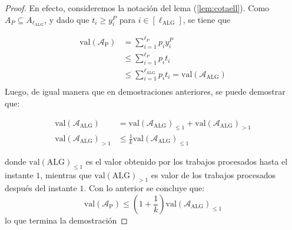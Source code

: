 \documentclass[10pt]{article}
\newcommand{\val}[1]{\text{val}(#1)}
\theoremstyle{plain}
\theoremstyle{definition}
\begin{document}
\begin{proof}
En efecto, consideremos la notación del lema (\ref{lem:cotaell}). Como $A_P \subseteq A_{\ell_{\text{ALG}}}$, y dado que $t_i \geq y^P_i$ para $i \in [\ell_{\text{ALG}}]$, se tiene que

\begin{align*}
\val{\mathcal{A}_\text{P}} &= \sum_{i=1}^{\ell_P} p_i y^P_i \\
						&\leq \sum_{i=1}^{\ell_P} p_i t_i \\
						&\leq \sum_{i=1}^{\ell_{\text{ALG}}} p_i t_i = \val{\mathcal{A}_\text{ALG}}\\
\end{align*}
Luego, de igual manera que en demostraciones anteriores, se puede demostrar que:

\begin{align*}
\val{\mathcal{A}_\text{ALG}} &= \val{\mathcal{A}_\text{ALG}}_{\leq 1} + \val{\mathcal{A}_\text{ALG}}_{> 1}\\
\val{\mathcal{A}_\text{ALG}}_{> 1} &\leq \frac{1}{k} \val{\mathcal{A}_\text{ALG}}_{\leq 1}
\end{align*}

donde $\val{\text{ALG}}_{\leq 1}$ es el valor obtenido por los trabajos procesados hasta el instante $1$, mientras que $\val{\text{ALG}}_{>1}$ es valor de los trabajos procesados despu\'es del instante $1$. Con lo anterior se concluye que:
$$
\val{\mathcal{A}_\text{P}} \leq \left(1 + \frac{1}{k} \right)\val{\mathcal{A}_\text{ALG}}_{\leq 1}
$$ 
lo que termina la demostraci\'on
\end{proof}
\end{document}
